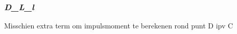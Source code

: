 \documentclass{article}
\begin{document}
\subsubsection{\textbf{\textit{D\_L\_l}}}
\begin{maplelatex}\begin{Maple Normal}{
Misschien extra term om impulsmoment te berekenen rond punt D ipv C}\end{Maple Normal}
\end{maplelatex}
\begin{maplelatex}\begin{Maple Normal}{
}\end{Maple Normal}
\end{maplelatex}
\begin{maplelatex}\begin{Maple Normal}{
}\end{Maple Normal}
\end{maplelatex}
\end{document}
